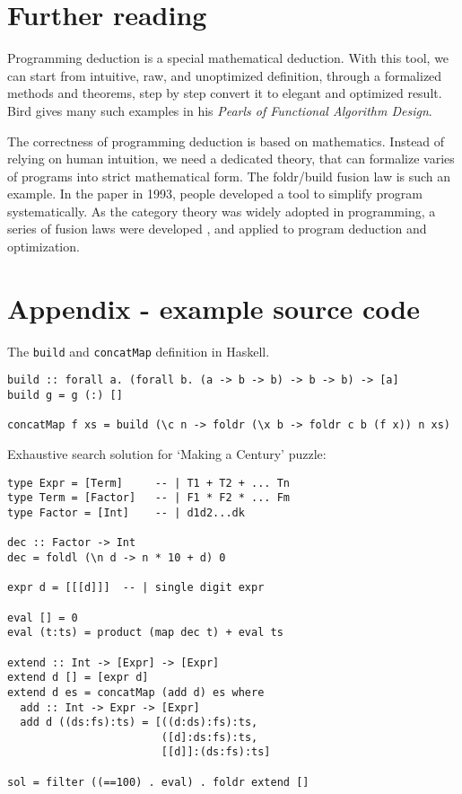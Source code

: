 \documentclass{article}
\begin{document}
\section{Further reading}

Programming deduction is a special mathematical deduction. With this tool, we can start from intuitive, raw, and unoptimized definition, through a formalized methods and theorems, step by step convert it to elegant and optimized result. Bird gives many such examples in his {\em Pearls of Functional Algorithm Design}\cite{Bird-2010}.

The correctness of programming deduction is based on mathematics. Instead of relying on human intuition, we need a dedicated theory, that can formalize varies of programs into strict mathematical form. The foldr/build fusion law is such an example. In the paper\cite{GLPJ-1993} in 1993, people developed a tool to simplify program systematically. As the category theory was widely adopted in programming, a series of fusion laws were developed \cite{Hinze-Harper-James-2010}, and applied to program deduction and optimization.

\section{Appendix - example source code}

The \texttt{build} and \texttt{concatMap} definition in Haskell.

\lstset{frame=single}
\begin{lstlisting}
build :: forall a. (forall b. (a -> b -> b) -> b -> b) -> [a]
build g = g (:) []

concatMap f xs = build (\c n -> foldr (\x b -> foldr c b (f x)) n xs)
\end{lstlisting}

Exhaustive search solution for `Making a Century' puzzle:

\begin{lstlisting}
type Expr = [Term]     -- | T1 + T2 + ... Tn
type Term = [Factor]   -- | F1 * F2 * ... Fm
type Factor = [Int]    -- | d1d2...dk

dec :: Factor -> Int
dec = foldl (\n d -> n * 10 + d) 0

expr d = [[[d]]]  -- | single digit expr

eval [] = 0
eval (t:ts) = product (map dec t) + eval ts

extend :: Int -> [Expr] -> [Expr]
extend d [] = [expr d]
extend d es = concatMap (add d) es where
  add :: Int -> Expr -> [Expr]
  add d ((ds:fs):ts) = [((d:ds):fs):ts,
                        ([d]:ds:fs):ts,
                        [[d]]:(ds:fs):ts]

sol = filter ((==100) . eval) . foldr extend []
\end{lstlisting}
\end{document}
